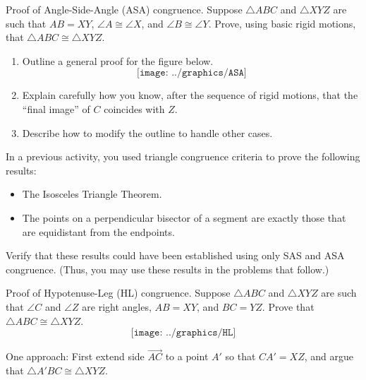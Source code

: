 \begin{prob}
Proof of Angle-Side-Angle (ASA) congruence.  Suppose $\triangle ABC$ and $\triangle XYZ$ are such that $AB=XY$, $\angle A \cong \angle X$, and $\angle B \cong \angle Y$.  Prove, using basic rigid motions, that $\triangle ABC \cong \triangle XYZ$.  
\begin{enumerate}
\item Outline a general proof for the figure below.  
$$\texttt{[image: ../graphics/ASA]}$$
\item Explain carefully how you know, after the sequence of rigid motions, that the ``final image'' of $C$ coincides with $Z$.  
\item Describe how to modify the outline to handle other cases. 
\end{enumerate}
\end{prob}

\begin{prob}
In a previous activity, you used triangle congruence criteria to prove the following results: 
\begin{itemize}
\item The Isosceles Triangle Theorem.
\item The points on a perpendicular bisector of a segment are exactly those that are equidistant from the endpoints.
\end{itemize}
Verify that these results could have been established using only SAS and ASA congruence.  (Thus, you may use these results in the problems that follow.) 
\end{prob}

\begin{prob}
Proof of Hypotenuse-Leg (HL) congruence.  Suppose $\triangle ABC$ and $\triangle XYZ$ are such that $\angle C$ and $\angle Z$ are right angles, $AB=XY$, and $BC=YZ$.  Prove that $\triangle ABC \cong \triangle XYZ$.  
$$\texttt{[image: ../graphics/HL]}$$
\end{prob}

\begin{teachingnote}
One approach:  First extend side $\overrightarrow{AC}$ to a point $A'$ so that $CA'=XZ$, and argue that $\triangle A'BC \cong \triangle XYZ$.
\end{teachingnote}


